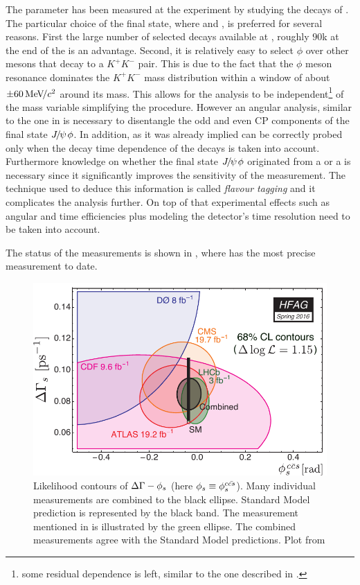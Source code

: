 The parameter \phis has been measured at the \lhcb experiment by studying the decays of \BsJpsiPhi\cite{phis-3fb-paper}.
The particular choice of the final state, where \phiKK and \Jpsimumu, is preferred for several reasons. First the large number
of selected \BsJpsiPhi decays available at \lhcb, roughly $90$k at the end of the \runtwo is an advantage. Second, it is relatively
easy to select $\phi$ over other mesons that decay to a $K^+K^-$ pair. This is due to the fact that the $\phi$ meson resonance dominates
the $K^+K^-$ mass distribution within a window of about $\pm 60 {\mathrm{\,Me\kern -0.1em V\!/}c^2}$ around its mass. This allows for the analysis to be
independent\footnote{some residual dependence is left, similar to the one described in . }
of the \mKK mass variable simplifying the procedure. However an angular analysis, similar to the one in  is necessary
to disentangle the odd and even CP components of the final state ${J\mskip -3mu/\mskip -2mu\psi\mskip 2mu}\phi$.
In addition, as it was already implied \phis can be correctly probed only when the decay time dependence of the \BsJpsiPhi decays is taken into
account. Furthermore knowledge on whether the final state ${J\mskip -3mu/\mskip -2mu\psi\mskip 2mu}\phi$ originated from a \Bs or a \Bsb is necessary since it
significantly improves the sensitivity of the \phis measurement. The technique used to deduce this information is called {\it flavour tagging}
and it complicates the analysis further. On top of that experimental effects such as angular and time efficiencies plus modeling the
\lhcb detector's time resolution need to be taken into account.

The status of the \phis measurements is shown in , where \lhcb has the most precise measurement to date.

\begin{figure}[!h]
  \centering
    \includegraphics[trim=0cm 0cm 0cm 0cm, clip=true, scale=0.8]{Figures/Chapter1/hfag_Spring2016_DGsphis_zoom.pdf}
    \caption{Likelihood contours of $\Delta\Gamma-\phi_{s}$ (here $\phi_{s}\equiv \phi_{s}^{c\bar{cs}}$). Many individual measurements are
             combined to the black ellipse. Standard Model prediction is represented by the black band. The \lhcb measurement
             mentioned in  is illustrated by the green ellipse. The combined measurements agree with the Standard Model
             predictions. Plot from \cite{hfag-2014} }
    \label{hfag_phis_dg}
\end{figure}


